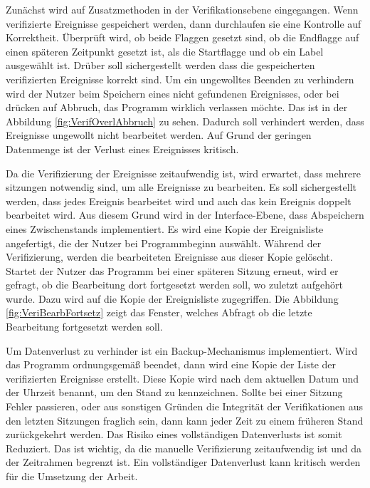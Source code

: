 Zunächst wird auf Zusatzmethoden in der Verifikationsebene eingegangen. Wenn verifizierte Ereignisse gespeichert werden, dann durchlaufen sie eine Kontrolle auf Korrektheit. Überprüft wird, ob beide Flaggen gesetzt sind, ob die Endflagge auf einen späteren Zeitpunkt gesetzt ist, als die Startflagge und ob ein Label ausgewählt ist. Drüber soll sichergestellt werden dass die gespeicherten verifizierten Ereignisse korrekt sind. Um ein ungewolltes Beenden zu verhindern wird der Nutzer beim  Speichern eines nicht gefundenen Ereignisses, oder bei drücken auf Abbruch, das Programm wirklich verlassen möchte. Das ist in der Abbildung \ref{fig:VerifOverlAbbruch} zu sehen. Dadurch soll verhindert werden, dass Ereignisse ungewollt nicht bearbeitet werden. Auf Grund der geringen Datenmenge ist der Verlust eines Ereignisses kritisch. 


Da die Verifizierung der Ereignisse zeitaufwendig ist, wird erwartet, dass mehrere sitzungen notwendig sind, um alle Ereignisse zu bearbeiten. Es soll sichergestellt werden, dass jedes Ereignis bearbeitet wird und auch das kein Ereignis doppelt bearbeitet wird. Aus diesem Grund wird in der Interface-Ebene, dass Abspeichern eines Zwischenstands implementiert. Es wird eine Kopie der Ereignisliste angefertigt, die der Nutzer bei Programmbeginn auswählt. Während der Verifizierung, werden die bearbeiteten Ereignisse aus dieser Kopie gelöscht. Startet der Nutzer das Programm bei einer späteren Sitzung erneut, wird er gefragt, ob die Bearbeitung dort fortgesetzt werden soll, wo zuletzt aufgehört wurde. Dazu wird auf die Kopie der Ereignisliste zugegriffen. Die Abbildung \ref{fig:VeriBearbFortsetz} zeigt das Fenster, welches Abfragt ob die letzte Bearbeitung fortgesetzt werden soll. 


Um Datenverlust zu verhinder ist ein Backup-Mechanismus implementiert. Wird das Programm ordnungsgemäß beendet, dann wird eine Kopie der Liste der verifizierten Ereignisse erstellt. Diese Kopie wird nach dem aktuellen Datum und der Uhrzeit benannt, um den Stand zu kennzeichnen. Sollte bei einer Sitzung Fehler passieren, oder aus sonstigen Gründen die Integrität der Verifikationen aus den letzten Sitzungen fraglich sein, dann kann jeder Zeit zu einem früheren Stand zurückgekehrt werden. Das Risiko eines vollständigen Datenverlusts ist somit Reduziert. Das ist wichtig, da die manuelle Verifizierung zeitaufwendig ist und da der Zeitrahmen begrenzt ist. Ein vollständiger Datenverlust kann kritisch werden für die Umsetzung der Arbeit. 